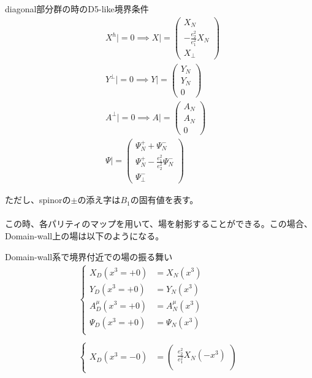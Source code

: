 \documentclass[dvipdfmx,a4paper,10.5pt]{article}
\numberwithin{equation}{section}
\begin{document}
\begin{enumerate}
\begin{resultbox}{diagonal部分群の時のD5-like境界条件}
    \begin{align*}
        &X^{h}|=0 \implies X|=\begin{pmatrix}
        X_{N}\\ -\frac{e^{2}_{2}}{e^{2}_{1}}X_{N} \\ X_{\perp}
    \end{pmatrix}\\
    & Y^{\perp}|=0 \implies Y|=\begin{pmatrix}
        Y_{N}\\ Y_{N} \\0
    \end{pmatrix}\\
    & A^{\perp}|=0 \implies A|=\begin{pmatrix}
        A_{N}\\ A_{N} \\0
    \end{pmatrix}\\
    &\Psi|=\begin{pmatrix}
        \Psi^{+}_{N}+\Psi^{-}_{N}\\ \Psi^{+}_{N}-\frac{e_{1}^{2}}{e_{2}^{2}}\Psi^{-}_{N} \\\Psi_{\perp}^{-}
    \end{pmatrix}
    \end{align*}
\end{resultbox}
ただし、spinorの$\pm$の添え字は$B_{1}$の固有値を表す。\\
\\
この時、各パリティのマップを用いて、場を射影することができる。この場合、Domain-wall上の場は以下のようになる。
\begin{resultbox}{Domain-wall系で境界付近での場の振る舞い}
    \begin{align*}
        \begin{cases}
            X_{D}(x^{3}=+ 0)&=X_{N}(x^{3})\\
            Y_{D}(x^{3}=+0)&=Y_{N}(x^{3})\\
            A^{\mu}_{D}(x^{3}=+ 0)&=A^{\mu}_{N}(x^{3})\\
            \Psi_{D}(x^{3}=+ 0)&=\Psi_{N}(x^{3})\\
        \end{cases}\\
        \\
        \begin{cases}
            X_{D}(x^{3}=- 0)&=
            \begin{pmatrix}
                \frac{e^{2}_{2}}{e^{2}_{1}}X_{N}(-x^{3})\\

\end{pmatrix}
\end{cases}
\end{align*}
\end{resultbox}
\end{enumerate}
\end{document}
